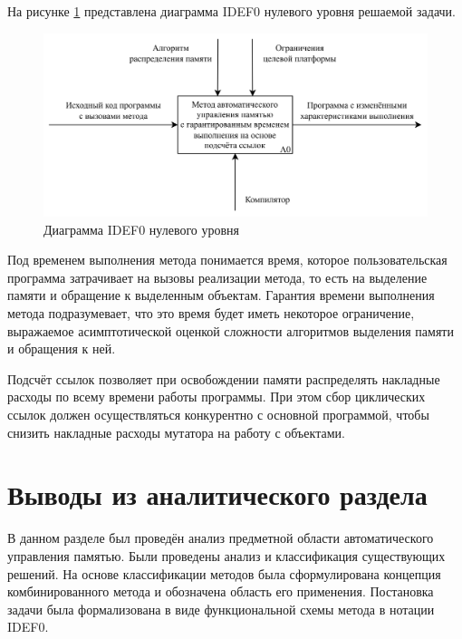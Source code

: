 На рисунке \ref{fig:idef0} представлена диаграмма IDEF0 нулевого уровня решаемой задачи.

\begin{figure}[H]
	\centering
	\includegraphics[width=\textwidth]{assets/idef0.png}
	\caption{Диаграмма IDEF0 нулевого уровня}
	\label{fig:idef0}
\end{figure}

Под временем выполнения метода понимается время, которое пользовательская программа затрачивает на вызовы реализации метода, то есть на выделение памяти и обращение к выделенным объектам. Гарантия времени выполнения метода подразумевает, что это время будет иметь некоторое ограничение, выражаемое асимптотической оценкой сложности алгоритмов выделения памяти и обращения к ней.

Подсчёт ссылок позволяет при освобождении памяти распределять накладные расходы по всему времени работы программы. При этом сбор циклических ссылок должен осуществляться конкурентно с основной программой, чтобы снизить накладные расходы мутатора на работу с объектами.



\section*{Выводы из аналитического раздела}

В данном разделе был проведён анализ предметной области автоматического управления памятью. Были проведены анализ и классификация существующих решений. На основе классификации методов была сформулирована концепция комбинированного метода и обозначена область его применения. Постановка задачи была формализована в виде функциональной схемы метода в нотации IDEF0.

